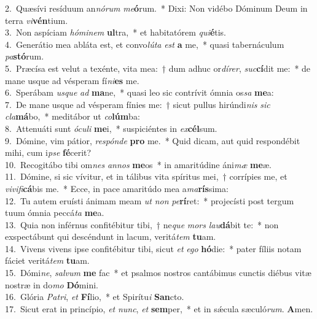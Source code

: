{2.~}Quæsívi resíduum an\textit{nó}\textit{rum} \textit{me}\textbf{ó}rum.~* Dixi: Non vidébo Dóminum Deum in terra \textit{vi}\textbf{vén}tium.\\
{3.~}Non aspíciam \textit{hó}\textit{mi}\textit{nem} \textbf{ul}tra,~* et habitatórem \textit{qui}\textbf{é}tis.\\
{4.~}Generátio mea abláta est, et convo\textit{lú}\textit{ta} \textit{est} \textbf{a} me,~* quasi tabernáculum \textit{pa}\textbf{stó}rum.\\
{5.~}Præcísa est velut a texénte, vita mea:~† dum adhuc or\textit{dí}\textit{rer}, \textit{suc}\textbf{cí}dit me:~* de mane usque ad vésperam fí\textit{ni}\textbf{es} me.\\
{6.~}Sperábam \textit{us}\textit{que} \textit{ad} \textbf{ma}ne,~* quasi leo sic contrívit ómnia os\textit{sa} \textbf{me}a:\\
{7.~}De mane usque ad vésperam fínies me:~† sicut pullus hirúndi\textit{nis} \textit{sic} \textit{cla}\textbf{má}bo,~* meditábor ut \textit{co}\textbf{lúm}ba:\\
{8.~}Attenuáti sunt \textit{ó}\textit{cu}\textit{li} \textbf{me}i,~* suspiciéntes in \textit{ex}\textbf{cél}sum.\\
{9.~}Dómine, vim pátior, \textit{re}\textit{spón}\textit{de} \textbf{pro} me.~* Quid dicam, aut quid respondébit mihi, cum i\textit{pse} \textbf{fé}cerit?\\
{10.~}Recogitábo tibi om\textit{nes} \textit{an}\textit{nos} \textbf{me}os~* in amaritúdine áni\textit{mæ} \textbf{me}æ.\\
{11.~}Dómine, si sic vívitur, et in tálibus vita spíritus mei,~† corrípies me, et \textit{vi}\textit{vi}\textit{fi}\textbf{cá}bis me.~* Ecce, in pace amaritúdo mea a\textit{ma}\textbf{rís}sima:\\
{12.~}Tu autem eruísti ánimam meam \textit{ut} \textit{non} \textit{pe}\textbf{rí}ret:~* projecísti post tergum tuum ómnia peccá\textit{ta} \textbf{me}a.\\
{13.~}Quia non inférnus confitébitur tibi,~† ne\textit{que} \textit{mors} \textit{lau}\textbf{dá}bit te:~* non exspectábunt qui descéndunt in lacum, veritá\textit{tem} \textbf{tu}am.\\
{14.~}Vivens vivens ipse confitébitur tibi, sicut \textit{et} \textit{e}\textit{go} \textbf{hó}die:~* pater fíliis notam fáciet veritá\textit{tem} \textbf{tu}am.\\
{15.~}Dómi\textit{ne}, \textit{sal}\textit{vum} \textbf{me} fac~* et psalmos nostros cantábimus cunctis diébus vitæ nostræ in do\textit{mo} \textbf{Dó}mini.\\
{16.~}Glória \textit{Pa}\textit{tri}, \textit{et} \textbf{Fí}lio,~* et Spirítu\textit{i} \textbf{San}cto.\\
{17.~}Sicut erat in princípio, \textit{et} \textit{nunc}, \textit{et} \textbf{sem}per,~* et in sǽcula sæculó\textit{rum}. \textbf{A}men.\\
